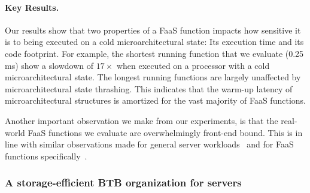 \documentclass[../main.tex]{subfiles}
\begin{document}
\begin{refsection}
\paragraph{Key Results.}
Our results show that two properties of a FaaS function impacts how
sensitive it is to being executed on a cold microarchitectural state:
Its execution time and its code footprint. For example, the shortest
running function that we evaluate (0.25 ms) show a slowdown of
$17\times$ when executed on a processor with a cold microarchitectural
state. The longest running functions are largely unaffected by
microarchitectural state thrashing. This indicates that the warm-up
latency of microarchitectural structures is amortized for the vast
majority of FaaS functions.

Another important observation we make from our experiments, is that
the real-world FaaS functions we evaluate are overwhelmingly front-end
bound. This is in line with similar observations made for general
server
workloads~\cite{ferdman12_clear_cloud,kanev15_profil,ayers19_asmdb}
and for FaaS functions specifically~\cite{lukewarm_serverless}.

\subsubsection{A storage-efficient BTB organization for servers}


\end{refsection}
\end{document}
